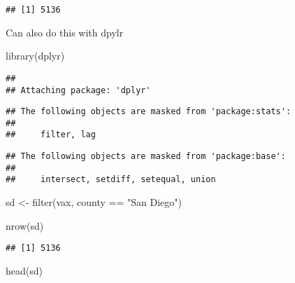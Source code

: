 \documentclass[
]{article}
\newenvironment{Shaded}{\begin{snugshade}}{\end{snugshade}}
\newcommand{\FunctionTok}[1]{\textcolor[rgb]{0.00,0.00,0.00}{#1}}
\newcommand{\NormalTok}[1]{#1}
\newcommand{\OtherTok}[1]{\textcolor[rgb]{0.56,0.35,0.01}{#1}}
\newcommand{\SpecialCharTok}[1]{\textcolor[rgb]{0.00,0.00,0.00}{#1}}
\newcommand{\StringTok}[1]{\textcolor[rgb]{0.31,0.60,0.02}{#1}}
\begin{document}
\begin{verbatim}
## [1] 5136
\end{verbatim}

Can also do this with dpylr

\begin{Shaded}
\begin{Highlighting}[]
\FunctionTok{library}\NormalTok{(dplyr)}
\end{Highlighting}
\end{Shaded}

\begin{verbatim}
## 
## Attaching package: 'dplyr'
\end{verbatim}

\begin{verbatim}
## The following objects are masked from 'package:stats':
## 
##     filter, lag
\end{verbatim}

\begin{verbatim}
## The following objects are masked from 'package:base':
## 
##     intersect, setdiff, setequal, union
\end{verbatim}

\begin{Shaded}
\begin{Highlighting}[]
\NormalTok{sd }\OtherTok{\textless{}{-}} \FunctionTok{filter}\NormalTok{(vax, county }\SpecialCharTok{==} \StringTok{"San Diego"}\NormalTok{)}

\FunctionTok{nrow}\NormalTok{(sd)}
\end{Highlighting}
\end{Shaded}

\begin{verbatim}
## [1] 5136
\end{verbatim}

\begin{Shaded}
\begin{Highlighting}[]
\FunctionTok{head}\NormalTok{(sd)}
\end{Highlighting}
\end{Shaded}
\end{document}
